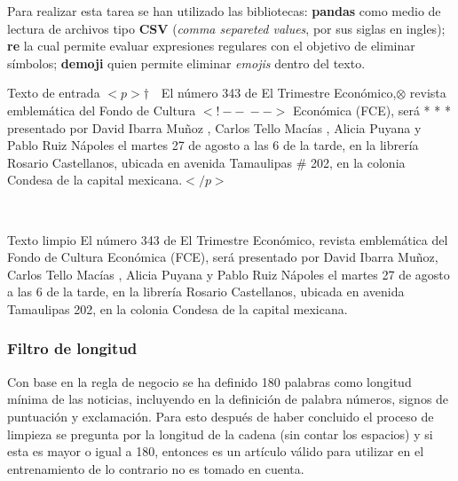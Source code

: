 Para realizar esta tarea se han utilizado las bibliotecas: \textbf{pandas} como medio de lectura de archivos tipo \textbf{CSV} (\textit{comma separeted values}, por sus siglas en ingles); \textbf{re} la cual permite evaluar expresiones regulares con el objetivo de eliminar símbolos; \textbf{demoji} quien permite eliminar \textit{emojis} dentro del texto.\\

\begin{mygraybox}[label={box:cp5:texto}]{Texto de entrada} 
$<p>\dagger$$\ \ \ $ El número 343 de El Trimestre Económico,$\otimes$ revista emblemática del Fondo de Cultura 
$<!--\ -->$
Económica (FCE), será * * * presentado por David Ibarra Muñoz \dSmiley , Carlos Tello Macías \dCooley , Alicia Puyana \dInnocey y Pablo Ruiz Nápoles el martes 27 de agosto a las 6 de la tarde, en la librería Rosario Castellanos, ubicada en avenida Tamaulipas \# 202, en la colonia Condesa de la capital mexicana.$</p>$
\end{mygraybox}

\ \\

\begin{mygraybox}[label={box:cp5:limpio}]{Texto limpio} 
El número 343 de El Trimestre Económico, revista emblemática del Fondo de Cultura 
Económica (FCE), será presentado por David Ibarra Muñoz, Carlos Tello Macías , Alicia Puyana y Pablo Ruiz Nápoles el martes 27 de agosto a las 6 de la tarde, en la librería Rosario Castellanos, ubicada en avenida Tamaulipas 202, en la colonia Condesa de la capital mexicana.
\end{mygraybox}
\subsubsection{Filtro de longitud}

Con base en la regla de negocio  se ha definido 180 palabras como longitud mínima de las noticias, incluyendo en la definición de palabra números, signos de puntuación y exclamación.
Para esto después de haber concluido el proceso de limpieza se pregunta por la longitud de la cadena (sin contar los espacios) y si esta es mayor o igual a 180, entonces es un artículo válido para utilizar en el entrenamiento de lo contrario no es tomado en cuenta.\\


